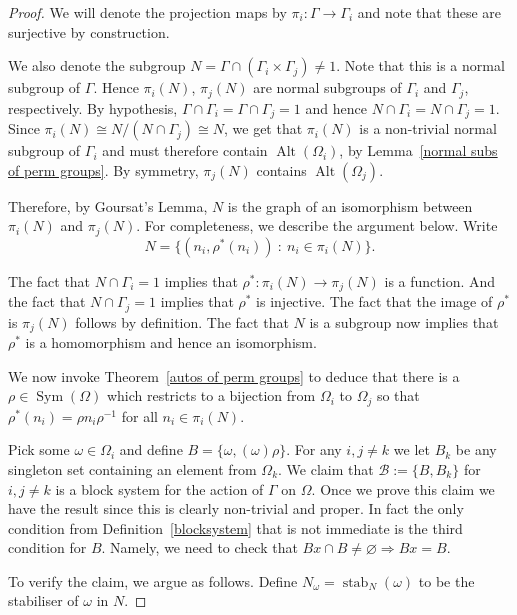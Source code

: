 \documentclass[11pt,a4paper]{amsart}
\renewcommand{\emptyset}{\varnothing}
\theoremstyle{definition}
\theoremstyle{remark}
\newcommand{\Sym}{\operatorname{Sym}}
\newcommand{\Alt}{\operatorname{Alt}}
\newcommand{\B}{\mathcal B}
\renewcommand{\implies}{\Rightarrow}
\newcommand{\stab}{\operatorname{stab}}
\begin{document}
\begin{proof}
	We will denote the projection maps by $\pi_i: \Gamma \to \Gamma_i$ and note that these are surjective by construction. 
	
	We also denote the subgroup $N=\Gamma \cap (\Gamma_i \times \Gamma_j) \neq 1$. Note that this is a normal subgroup of $\Gamma$. Hence $\pi_i(N)$, $\pi_j(N)$ are normal subgroups of $\Gamma_i$ and $\Gamma_j$, respectively. By hypothesis, $\Gamma \cap \Gamma_i = \Gamma \cap \Gamma_j = 1$ and hence $N \cap \Gamma_i=N \cap \Gamma_j =1$. Since $\pi_i(N) \cong N/(N \cap \Gamma_j) \cong N$, we get that $\pi_i(N)$ is a non-trivial normal subgroup of $\Gamma_i$ and must therefore contain $\Alt(\Omega_i)$, by Lemma~\ref{normal subs of perm groups}. By symmetry, $\pi_j(N)$ contains $\Alt(\Omega_j)$.  
	
	
	Therefore, by Goursat's Lemma, $N$ is the graph of an isomorphism between $\pi_i(N)$ and $\pi_j(N)$. For completeness, we describe the argument below. Write 
	 $$
	 N = \{ (n_i, \rho^*(n_i)) \ : \ n_i \in \pi_i(N)\}. 
	 $$
	 
	 The fact that $N \cap \Gamma_i=1$ implies that $\rho^*: \pi_i(N) \to \pi_j(N)$ is a function. And the fact that $N \cap \Gamma_j =1$ implies that $\rho^*$ is injective. The fact that the image of $\rho^*$ is $\pi_j(N)$ follows by definition. The fact that $N$ is a subgroup now implies that $\rho^*$ is a homomorphism and hence an isomorphism. 
	 
	 We now invoke Theorem~\ref{autos of perm groups} to deduce that there is a $\rho\in \Sym(\Omega)$ which restricts to a bijection from $\Omega_i$ to $\Omega_j$ so that $\rho^*(n_i) = \rho n_i \rho^{-1}$ for all $n_i \in \pi_i(N)$.
	 
	Pick some $\omega \in \Omega_i$ and define $B = \{ \omega, (\omega)\rho \}$. For any $i, j \neq k$ we let $B_k$ be any singleton set containing an element from $\Omega_k$. We claim that $\B:=\{B, B_k \}$ for $i,j \neq k$ is a block system for the action of $\Gamma$ on $\Omega$. Once we prove this claim we have the result since this is clearly non-trivial and proper. In fact the only condition from Definition~\ref{blocksystem} that is not immediate is the third condition for $B$. Namely, we need to check that $Bx \cap B \neq \emptyset \implies Bx = B$. 
	 
	 To verify the claim, we argue as follows. Define $N_{\omega}=\stab_N(\omega)$ to be the stabiliser of $\omega$ in $N$. 
	 

\end{proof}
\end{document}

